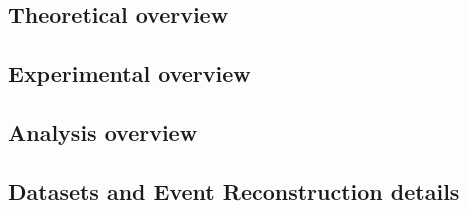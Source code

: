 \documentclass[12pt]{article}
\begin{document}


\subsection{Theoretical overview}
\subsection{Experimental overview}
\subsection{Analysis overview}
\subsection{Datasets and Event Reconstruction details}
\end{document}
